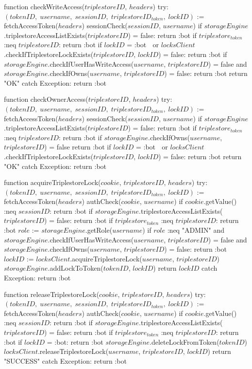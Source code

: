 function checkWriteAccess($triplestoreID$, $headers$) 
    try: 
        $(tokenID, \; username, \; sessionID, \; triplestoreID_{token}, \; lockID)$ := fetchAccessToken($headers$)
        sessionCheck($sessionID$, $username$)
        if $storageEngine$.triplestoreAccessListExists($triplestoreID$) = false:
            return :bot
        if $triplestore_{token}$ :neq $triplestoreID$:
            return :bot
        if $lockID$ = :bot $\;$ or $locksClient$.checkIfTriplestoreLockExists($triplestoreID$, $lockID$) = false:
            return :bot
        if $storageEngine$.checkIfUserHasWriteAccess($username$, $triplestoreID$) = false and $storageEngine$.checkIfOwns($username$, $triplestoreID$) = false:
            return :bot
        return "OK"
    catch Exception: 
        return :bot

function checkOwnerAccess($triplestoreID$, $headers$) 
    try: 
        $(tokenID, \; username, \; sessionID, \; triplestoreID_{token}, \; lockID)$ := fetchAccessToken($headers$) 
        sessionCheck($sessionID$, $username$)
        if $storageEngine$.triplestoreAccessListExists($triplestoreID$) = false:
            return :bot
        if $triplestore_{token}$ :neq $triplestoreID$:
            return :bot
        if $storageEngine$.checkIfOwns($username$, $triplestoreID$) = false
            return :bot
        if $lockID$ = :bot $\;$ or $locksClient$.checkIfTriplestoreLockExists($triplestoreID$, $lockID$) = false:
            return :bot
        return "OK"
    catch Exception: 
        return :bot

function acquireTriplestoreLock($cookie$, $triplestoreID$, $headers$) 
    try: 
        $(tokenID, \; username, \; sessionID, \; triplestoreID_{token}, \; lockID)$ := fetchAccessToken($headers$) 
        authCheck($cookie$, $username$)
        if $cookie$.getValue() :neq $sessionID$: 
            return :bot
        if $storageEngine$.triplestoreAccessListExists($triplestoreID$) = false:
            return :bot
        if $triplestore_{token}$ :neq $triplestoreID$:
            return :bot
        $role$ := $storageEngine$.getRole($username$)
        if $role$ :neq "ADMIN" and $storageEngine$.checkIfUserHasWriteAccess($username$, $triplestoreID$) = false and $storageEngine$.checkIfOwns($username$, $triplestoreID$) = false:
            return :bot
        $lockID$ := $locksClient$.acquireTriplestoreLock($username$, $triplestoreID$)
        $storageEngine$.addLockToToken($tokenID$, $lockID$)
        return $lockID$
    catch Exception: 
        return :bot

function releaseTriplestoreLock($cookie$, $triplestoreID$, $headers$) 
    try: 
        $(tokenID, \; username, \; sessionID, \; triplestoreID_{token}, \; lockID)$ := fetchAccessToken($headers$) 
        authCheck($cookie$, $username$)
        if $cookie$.getValue() :neq $sessionID$: 
            return :bot
        if $storageEngine$.triplestoreAccessListExists($triplestoreID$) = false:
            return :bot
        if $triplestore_{token}$ :neq $triplestoreID$:
            return :bot
        if $lockID$ = :bot:
            return :bot
        $storageEngine$.deleteLockFromToken($tokenID$)
        $locksClient$.releaseTriplestoreLock($username$, $triplestoreID$, $lockID$)
        return "SUCCESS"
     catch Exception: 
        return :bot

